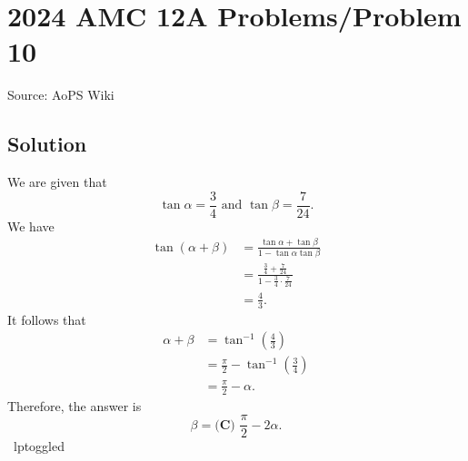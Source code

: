 \documentclass[12pt]{article}
\begin{document}
\section*{{2024 AMC 12A Problems/Problem 10}}
Source: AoPS Wiki

\subsection*{Solution}
We are given that \[\tan\alpha=\frac{3}{4} \text{ and } \tan\beta=\frac{7}{24}.\] We have \begin{align*} \tan(\alpha+\beta) &= \frac{\tan\alpha+\tan\beta}{1-\tan\alpha\tan\beta} \\ &= \frac{\frac{3}{4}+\frac{7}{24}}{1-\frac{3}{4} \cdot \frac{7}{24}} \\ &= \frac{4}{3}. \end{align*} It follows that \begin{align*} \alpha+\beta&=\tan^{-1}\left(\frac{4}{3}\right) \\ &=\frac{\pi}{2}-\tan^{-1}\left(\frac{3}{4}\right) \\ &=\frac{\pi}{2}-\alpha. \end{align*} Therefore, the answer is \[\beta=\boxed{\textbf{(C) }\frac{\pi}{2}-2\alpha}.\] ~lptoggled
\end{document}
